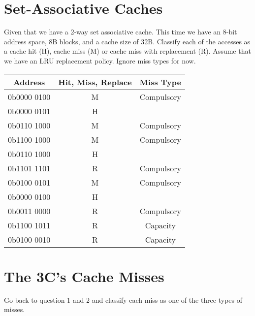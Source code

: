 \documentclass{article}
\begin{document}
\section{Set-Associative Caches}
Given that we have a 2-way set associative cache. This time we have an 8-bit address space, 8B blocks, and a cache size of 32B. Classify each of the accesses as a cache hit (H), cache miss (M) or cache miss with replacement (R). Assume that we have an LRU replacement policy. Ignore miss types for now.\\
\begin{table}[H]
    \centering
    \ttfamily
    \begin{tabular}{|c|c|c|}
        \hline
        Address                 & Hit, Miss, Replace & Miss Type\\ \hline
        0b0000 0100                   &      M              & Compulsory\\ \hline
        0b0000 0101                   &      H              & \\ \hline
        0b0110 1000                   &      M              & Compulsory\\ \hline
        0b1100 1000                   &      M              & Compulsory\\ \hline
        0b0110 1000                   &      H              & \\ \hline
        0b1101 1101                   &      R              & Compulsory\\ \hline
        0b0100 0101                   &      M              & Compulsory\\ \hline
        0b0000 0100                   &      H              & \\ \hline
        0b0011 0000                   &      R              & Compulsory\\ \hline
        0b1100 1011                   &      R              & Capacity\\ \hline
        0b0100 0010                   &      R              & Capacity\\ \hline
    \end{tabular}
\end{table}

\section{The 3C's Cache Misses}
Go back to question 1 and 2 and classify each miss as one of the three types of misses.\\
\end{document}
